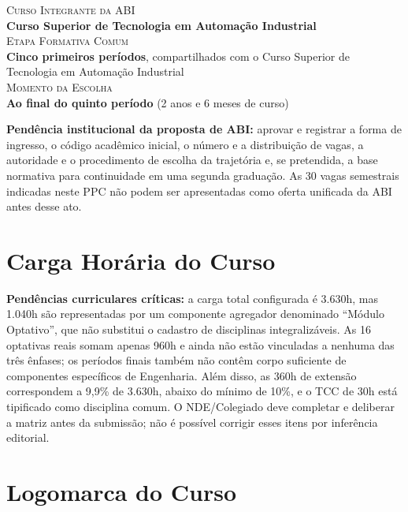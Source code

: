 \parbox{0.8\textwidth}{
    \textsc{\small \textcolor{AzulClaro}{Curso Integrante da ABI}} \\ \hspace*{15mm} \textbf{Curso Superior de Tecnologia em Automação Industrial}\\
    \textsc{\small \textcolor{AzulClaro}{Etapa Formativa Comum}} \\ \hspace*{15mm} \textbf{Cinco primeiros períodos}, compartilhados com o Curso Superior de Tecnologia em Automação Industrial\\
    \textsc{\small \textcolor{AzulClaro}{Momento da Escolha}} \\ \hspace*{15mm} \textbf{Ao final do quinto período} (2 anos e 6 meses de curso)\\
}

\textbf{Pendência institucional da proposta de ABI:} aprovar e registrar a forma de ingresso, o código acadêmico inicial, o número e a distribuição de vagas, a autoridade e o procedimento de escolha da trajetória e, se pretendida, a base normativa para continuidade em uma segunda graduação. As 30 vagas semestrais indicadas neste PPC não podem ser apresentadas como oferta unificada da ABI antes desse ato.

\section*{Carga Horária do Curso}



\textbf{Pendências curriculares críticas:} a carga total configurada é 3.630h, mas 1.040h são representadas por um componente agregador denominado ``Módulo Optativo'', que não substitui o cadastro de disciplinas integralizáveis. As 16 optativas reais somam apenas 960h e ainda não estão vinculadas a nenhuma das três ênfases; os períodos finais também não contêm corpo suficiente de componentes específicos de Engenharia. Além disso, as 360h de extensão correspondem a 9,9\% de 3.630h, abaixo do mínimo de 10\%, e o TCC de 30h está tipificado como disciplina comum. O NDE/Colegiado deve completar e deliberar a matriz antes da submissão; não é possível corrigir esses itens por inferência editorial.

\newpage
\section*{Logomarca do Curso}

